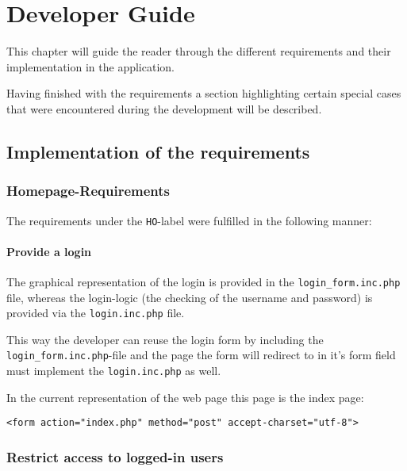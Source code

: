 \chapter{Developer Guide}\label{ch:developer_guide} %

This chapter will guide the reader through the different requirements and their implementation in the application.

Having finished with the requirements a section highlighting certain special cases that were encountered during the development will be described.

\section{Implementation of the requirements}
\label{sec:implementation_requirements}

\subsection{Homepage-Requirements}
\label{subsec:homepage_requirements}

The requirements under the \texttt{HO}-label were fulfilled in the following manner:

\subsubsection{Provide a login}

The graphical representation of the login is provided in the \texttt{login\_form.inc.php} file, whereas the login-logic (the checking of the username and password) is provided via the \texttt{login.inc.php} file.

This way the developer can reuse the login form by including the \texttt{login\_form.inc.php}-file and the page the form will redirect to in it's form field must implement the \texttt{login.inc.php} as well.

In the current representation of the web page this page is the index page:

\begin{lstlisting}[caption=Redirecting the login\_form.inc.php to the index page]
<form action="index.php" method="post" accept-charset="utf-8">
\end{lstlisting}

\subsection{Restrict access to logged-in users}


